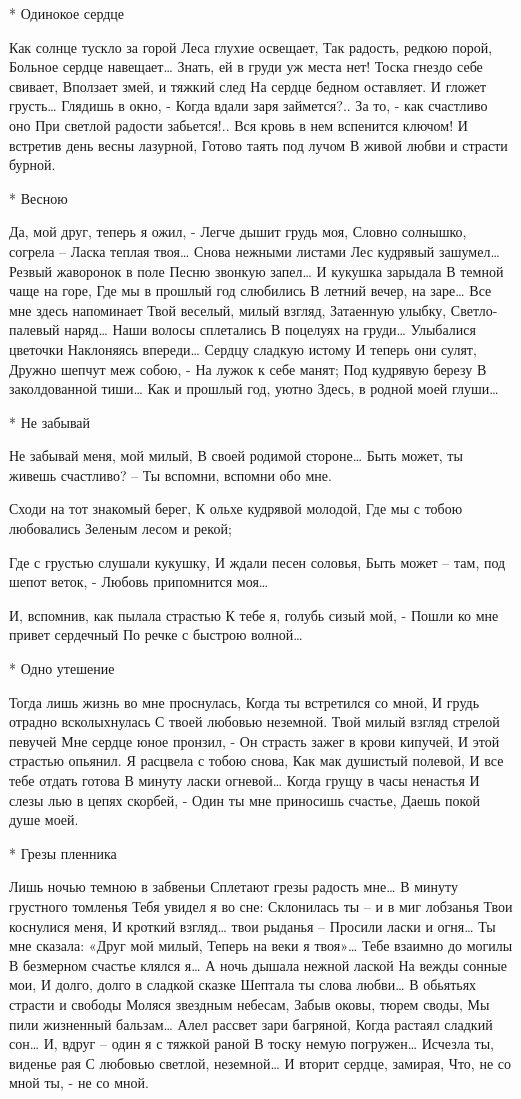 * Одинокое сердце

Как солнце тускло за горой
Леса глухие освещает,
Так радость, редкою порой,
Больное сердце навещает…
Знать, ей в груди уж места нет!
Тоска гнездо себе свивает,
Вползает змей, и тяжкий след
На сердце бедном оставляет.
И гложет грусть… Глядишь в окно, -
Когда вдали заря займется?..
За то, - как счастливо оно
При светлой радости забьется!..
Вся кровь в нем вспенится ключом!
И встретив день весны лазурной,
Готово таять под лучом
В живой любви и страсти бурной.


* Весною

Да, мой друг, теперь я ожил, -
Легче дышит грудь моя,
Словно солнышко, согрела –
Ласка теплая твоя…
Снова нежными листами
Лес кудрявый зашумел…
Резвый жаворонок в поле
Песню звонкую запел…
И кукушка зарыдала
В темной чаще на горе,
Где мы в прошлый год слюбились
В летний вечер, на заре…
Все мне здесь напоминает
Твой веселый, милый взгляд,
Затаенную улыбку,
Светло-палевый наряд…
Наши волосы сплетались
В поцелуях на груди…
Улыбалися цветочки
Наклоняясь впереди…
Сердцу сладкую истому
И теперь они сулят,
Дружно шепчут меж собою, -
На лужок к себе манят;
Под кудрявую березу
В заколдованной тиши…
Как и прошлый год, уютно
Здесь, в родной моей глуши…


* Не забывай

Не забывай меня, мой милый,
В своей родимой стороне…
Быть может, ты живешь счастливо? –
Ты вспомни, вспомни обо мне.

Сходи на тот знакомый берег,
К ольхе кудрявой молодой,
Где мы с тобою любовались
Зеленым лесом и рекой;

Где с грустью слушали кукушку,
И ждали песен соловья,
Быть может – там, под шепот веток, -
Любовь припомнится моя…

И, вспомнив, как пылала страстью
К тебе я, голубь сизый мой, -
Пошли ко мне привет сердечный
По речке с быстрою волной…


* Одно утешение

Тогда лишь жизнь во мне проснулась,
Когда ты встретился со мной,
И грудь отрадно всколыхнулась
С твоей любовью неземной.
Твой милый взгляд стрелой певучей
Мне сердце юное пронзил, -
Он страсть зажег в крови кипучей,
И этой страстью опьянил.
Я расцвела с тобою снова,
Как мак душистый полевой,
И все тебе отдать готова
В минуту ласки огневой…
Когда грущу в часы ненастья
И слезы лью в цепях скорбей, -
Один ты мне приносишь счастье,
Даешь покой душе моей.


* Грезы пленника

Лишь ночью темною в забвеньи
Сплетают грезы радость мне…
В минуту грустного томленья
Тебя увидел я во сне:
Склонилась ты – и в миг лобзанья
Твои коснулися меня,
И кроткий взгляд… твои рыданья –
Просили ласки и огня…
Ты мне сказала: «Друг мой милый,
Теперь на веки я твоя»…
Тебе взаимно до могилы
В безмерном счастье клялся я…
А ночь дышала нежной лаской
На вежды сонные мои,
И долго, долго в сладкой сказке
Шептала ты слова любви…
В обьятьях страсти и свободы
Моляся звездным небесам,
Забыв оковы, тюрем своды,
Мы пили жизненный бальзам…
Алел рассвет зари багряной,
Когда растаял сладкий сон…
И, вдруг – один я с тяжкой раной
В тоску немую погружен…
Исчезла ты, виденье рая
С любовью светлой, неземной…
И вторит сердце, замирая,
Что, не со мной ты, - не со мной.


